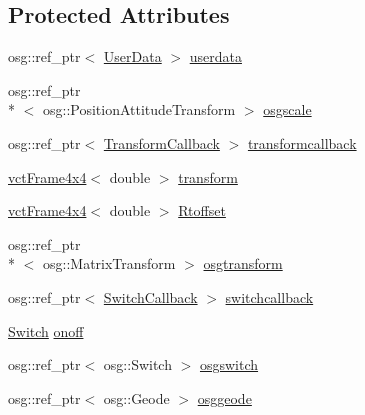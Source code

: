 \subsection*{Protected Attributes}
\begin{DoxyCompactItemize}
\item 
osg\-::ref\-\_\-ptr$<$ \hyperlink{classosa_o_s_g_body_1_1_user_data}{User\-Data} $>$ \hyperlink{classosa_o_s_g_body_aaaa048aa92048243a7bf355e6d178ec1}{userdata}
\item 
osg\-::ref\-\_\-ptr\\*
$<$ osg\-::\-Position\-Attitude\-Transform $>$ \hyperlink{classosa_o_s_g_body_ac68655b29f93f536143816956b5e1c5d}{osgscale}
\item 
osg\-::ref\-\_\-ptr$<$ \hyperlink{classosa_o_s_g_body_1_1_transform_callback}{Transform\-Callback} $>$ \hyperlink{classosa_o_s_g_body_a8d4d3d23660fa1fbd6cdfec7e2541a14}{transformcallback}
\item 
\hyperlink{classvct_frame4x4}{vct\-Frame4x4}$<$ double $>$ \hyperlink{classosa_o_s_g_body_a587be8e221a906f5c8d9676fadea5caf}{transform}
\item 
\hyperlink{classvct_frame4x4}{vct\-Frame4x4}$<$ double $>$ \hyperlink{classosa_o_s_g_body_ad008984bdb0eda300948932eda13974a}{Rtoffset}
\item 
osg\-::ref\-\_\-ptr\\*
$<$ osg\-::\-Matrix\-Transform $>$ \hyperlink{classosa_o_s_g_body_a7077ad80a1b17557f29ddda29ed0b7ec}{osgtransform}
\item 
osg\-::ref\-\_\-ptr$<$ \hyperlink{classosa_o_s_g_body_1_1_switch_callback}{Switch\-Callback} $>$ \hyperlink{classosa_o_s_g_body_a5f183b1bed32990d46bfa30bc466391b}{switchcallback}
\item 
\hyperlink{classosa_o_s_g_body_a1820a6192991316ef8fdeb216538c370}{Switch} \hyperlink{classosa_o_s_g_body_a2f491c9c85f3e0d097f342af4e20b9ea}{onoff}
\item 
osg\-::ref\-\_\-ptr$<$ osg\-::\-Switch $>$ \hyperlink{classosa_o_s_g_body_ad40360f7384568a29bdceaee80d0ca23}{osgswitch}
\item 
osg\-::ref\-\_\-ptr$<$ osg\-::\-Geode $>$ \hyperlink{classosa_o_s_g_body_a581c0cb7bfb2f67fa0c95888b1421859}{osggeode}
\end{DoxyCompactItemize}


